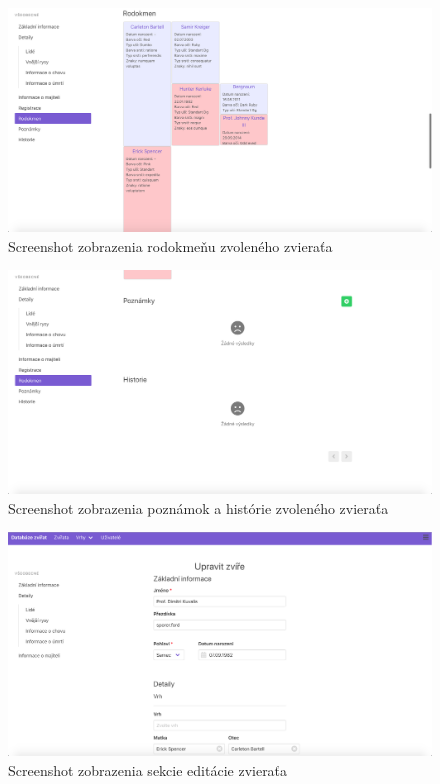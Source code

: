 \begin{figure}[H]
	\includegraphics[width=1.0\textwidth]{media/priloha/zviera/3.png}
	\caption{Screenshot zobrazenia rodokmeňu zvoleného zvieraťa}
\end{figure}

\vspace*{\fill}

\begin{figure}[H]
	\includegraphics[width=1.0\textwidth]{media/priloha/zviera/4.png}
	\caption{Screenshot zobrazenia poznámok a histórie zvoleného zvieraťa}
\end{figure}

\begin{figure}[H]
	\includegraphics[width=1.0\textwidth]{media/priloha/zviera/editacia/1.png}
	\caption{Screenshot zobrazenia sekcie editácie zvieraťa}
\end{figure}

